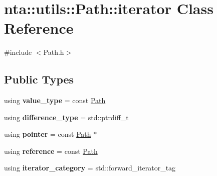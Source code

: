 \hypertarget{classnta_1_1utils_1_1Path_1_1iterator}{}\section{nta\+:\+:utils\+:\+:Path\+:\+:iterator Class Reference}
\label{classnta_1_1utils_1_1Path_1_1iterator}


{\ttfamily \#include $<$Path.\+h$>$}

\subsection*{Public Types}
\begin{DoxyCompactItemize}
\item 
\mbox{\label{classnta_1_1utils_1_1Path_1_1iterator_a783838eb5e234ef98462a41d9936b2eb}} 
using {\bfseries value\+\_\+type} = const \hyperlink{classnta_1_1utils_1_1Path}{Path}
\item 
\mbox{\label{classnta_1_1utils_1_1Path_1_1iterator_a16ec4a1e46aa7ca5d70624886df88cf8}} 
using {\bfseries difference\+\_\+type} = std\+::ptrdiff\+\_\+t
\item 
\mbox{\label{classnta_1_1utils_1_1Path_1_1iterator_af11fe20540cd59b968d957a8beadfa9d}} 
using {\bfseries pointer} = const \hyperlink{classnta_1_1utils_1_1Path}{Path} $\ast$
\item 
\mbox{\label{classnta_1_1utils_1_1Path_1_1iterator_a3fc9f0f5211089ea3f00949a9db65356}} 
using {\bfseries reference} = const \hyperlink{classnta_1_1utils_1_1Path}{Path}
\item 
\mbox{\label{classnta_1_1utils_1_1Path_1_1iterator_a0b3ffa69e2f5d5f4fe5bf45262d3af42}} 
using {\bfseries iterator\+\_\+category} = std\+::forward\+\_\+iterator\+\_\+tag
\end{DoxyCompactItemize}
